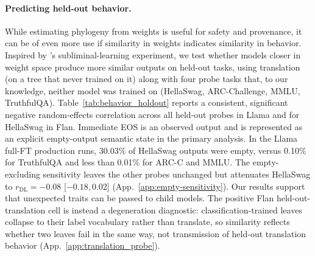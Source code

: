 \documentclass{article}
\theoremstyle{definition}
\theoremstyle{plain}
\begin{document}
\paragraph{Predicting held-out behavior.}
\label{sec:results:behavioral}

While estimating phylogeny from weights is useful for safety and provenance, it can be of even more use if similarity in weights indicates similarity in behavior. Inspired by \citet{cloud2025subliminal}'s subliminal-learning experiment, we test
whether models closer in weight space produce more similar outputs on held-out tasks, using translation
(on a tree that never trained on it) along with four probe tasks that, to our knowledge, neither model
was trained on (HellaSwag, ARC-Challenge, MMLU, TruthfulQA).
Table~\ref{tab:behavior_holdout} reports a consistent, significant negative random-effects correlation across all held-out
probes in Llama and for HellaSwag in Flan. Immediate EOS is an observed output and is represented as an
explicit empty-output semantic state in the primary analysis. In the Llama full-FT production runs,
30.03\% of HellaSwag outputs were empty, versus 0.10\% for TruthfulQA and less than 0.01\% for ARC-C
and MMLU. The empty-excluding sensitivity leaves the other probes unchanged but attenuates HellaSwag
to $r_{\mathrm{DL}}=-0.08$ [$-0.18,0.02$] (App.~\ref{app:empty-sensitivity}). Our results support that unexpected traits can be passed to child
models. The positive Flan held-out-translation cell is instead a degeneration diagnostic:
classification-trained leaves collapse to their label vocabulary rather than translate, so similarity
reflects whether two leaves fail in the same way, not transmission of held-out translation behavior
(App.~\ref{app:translation_probe}).
\end{document}
